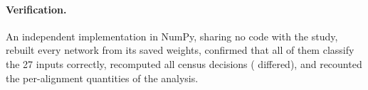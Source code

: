 \paragraph{Verification.}
An independent implementation in NumPy, sharing no code with the study, rebuilt every network from its saved weights,
confirmed that all of them classify the 27 inputs correctly, recomputed all \TrnVerifiedDecisions{} census decisions
(\TrnVerifiedDiffer{} differed), and recounted the per-alignment quantities of the analysis.
